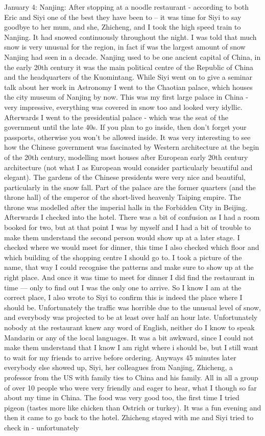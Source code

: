 January 4: Nanjing:
After stopping at a noodle restaurant - according to both Eric and Siyi one of the best they have been to -- it was time for Siyi to say goodbye to her mum, and she, Zhicheng, and I took the high speed train to Nanjing. It had snowed continuously throughout the night. I was told that much snow is very unusual for the region, in fact if was the largest amount of snow Nanjing had seen in a decade. Nanjing used to be one ancient capital of China, in the early 20th century it was the main political centre of the Republic of China and the headquarters of the Kuomintang. While Siyi went on to give a seminar talk about her work in Astronomy I went to the Chaotian palace, which houses the city museum of Nanjing by now. This was my first large palace in China - very impressive, everything was covered in snow too and looked very idyllic. Afterwards I went to the presidential palace - which was the seat of the government until the late 40s. If you plan to go inside, then don't forget your passports, otherwise you won't be allowed inside. It was very interesting to see how the Chinese government was fascinated by Western architecture at the begin of the 20th century, modelling most houses after European early 20th century architecture (not what I as European would consider particularly beautiful and elegant). The gardens of the Chinese presidents were very nice and beautiful, particularly in the snow fall. Part of the palace are the former quarters (and the throne hall) of the emperor of the short-lived heavenly Taiping empire. The throne was modelled after the imperial halls in the Forbidden City in Beijing. Afterwards I checked into the hotel. There was a bit of confusion as I had a room booked for two, but at that point I was by myself and I had a bit of trouble to make them understand the second person would show up at a later stage. I checked where we would meet for dinner, this time I also checked which floor and which building of the shopping centre I should go to. I took a picture of the name, that way I could recognise the patterns and make sure to show up at the right place. And once it was time to meet for dinner I did find the restaurant in time --- only to find out I was the only one to arrive. So I know I am at the correct place, I also wrote to Siyi to confirm this is indeed the place where I should be. Unfortunately the traffic was horrible due to the unusual level of snow, and everybody was projected to be at least over half an hour late. Unfortunately nobody at the restaurant knew any word of English, neither do I know to speak Mandarin or any of the local languages. It was a bit awkward, since I could not make them understand that I know I am right where i should be, but I still want to wait for my friends to arrive before ordering. Anyways 45 minutes later everybody else showed up, Siyi, her colleagues from Nanjing, Zhicheng, a professor from the US with family ties to China and his family. All in all a group of over 10 people who were very friendly and eager to hear, what I though so far about my time in China. The food was very good too, the first time I tried pigeon (tastes more like chicken than Ostrich or turkey). It was a fun evening and then it came to go back to the hotel. Zhicheng stayed with me and Siyi tried to check in - unfortunately 